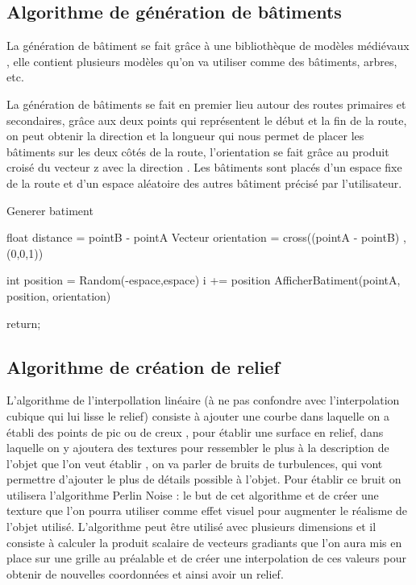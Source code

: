 \subsection{Algorithme de génération de bâtiments}

La génération de bâtiment se fait grâce à une bibliothèque de modèles médiévaux \cite{Assets}, elle contient plusieurs modèles qu’on va utiliser comme des bâtiments, arbres, etc.

La génération de bâtiments se fait en premier lieu autour des routes primaires et secondaires, grâce aux deux points qui représentent 
le début et la fin de la route, on peut obtenir la direction et la longueur qui nous permet de placer les bâtiments sur les deux côtés de la route, 
l’orientation se fait grâce au produit croisé du vecteur z avec la direction .
Les bâtiments sont placés d'un espace fixe de la route et d'un espace aléatoire des autres bâtiment précisé par l'utilisateur.

\begin{algorithm}
  \caption{Generer batiment}
  
  float distance = pointB - pointA\;
  Vecteur orientation = cross((pointA - pointB) , (0,0,1))\;

  {
    int position = Random(-espace,espace)\;
    i += position\;
    AfficherBatiment(pointA, position, orientation)\;
  }

  return;
\end{algorithm}

\newpage

\subsection{Algorithme de création de relief}

L’algorithme de l’interpollation linéaire (à ne pas confondre avec l’interpolation cubique qui lui lisse le relief) consiste à ajouter une courbe dans laquelle on a établi des points de pic ou de creux , pour établir une surface en relief, dans laquelle on y ajoutera des textures pour ressembler le plus à la description de l’objet que l’on veut établir , on va parler de bruits de turbulences, qui vont permettre d’ajouter le plus de détails possible à l’objet. Pour établir ce bruit on utilisera l’algorithme Perlin Noise : le but de cet algorithme et de créer une texture que l’on pourra utiliser comme effet visuel pour augmenter le réalisme de l’objet utilisé. L'algorithme peut être utilisé avec plusieurs dimensions et il consiste à calculer la produit scalaire de vecteurs gradiants que l'on aura mis en place sur une grille au préalable et de créer une interpolation de ces valeurs pour obtenir de nouvelles coordonnées et ainsi avoir un relief.

